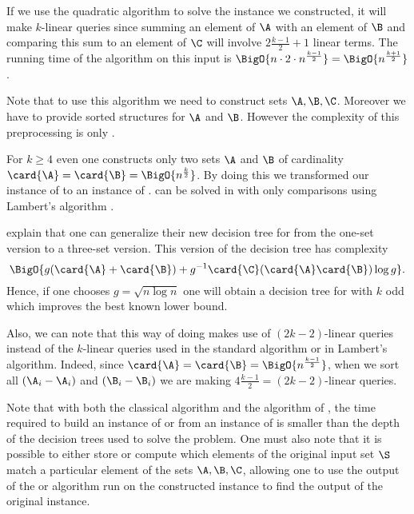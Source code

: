 If we use the quadratic \threeSUM algorithm to solve the instance we
constructed, it will make \(k\)-linear queries since summing an element of
\(\A\) with an element of \(\B\) and comparing this sum to an element of
\(\C\) will involve \(2 \frac{k-1}{2} + 1\) linear terms. The running time of
the \threeSUM algorithm on this input is \(\BigO{n \cdot 2 \cdot n^{\frac{k-1}{2}}} =
\BigO{n^{\frac{k+1}{2}}}\).

Note that to use this algorithm we need to construct sets \(\A,\B,\C\).
Moreover we have to provide sorted structures for \(\A\) and \(\B\). However
the complexity of this preprocessing is only .

For \(k \ge 4\) even one constructs only two sets \(\A\) and \(\B\) of
cardinality \(\card{\A} = \card{\B} = \BigO{n^{\frac{k}{2}}}\). By doing this
we transformed our instance of \kLDT to an instance of \twoSUM. \twoSUM can be
solved in  with only 
comparisons using Lambert's algorithm \cite{lambert:1990}.

\citet*{gronlund:2014} explain that one can generalize their new decision tree
for \threeSUM from the one-set version to a three-set version. This version of
the decision tree has complexity
\begin{displaymath}
\BigO{g(\card{\A}+\card{\B}) + g^{-1}\card{\C}(\card{\A}\card{\B})\log g}.
\end{displaymath}
Hence, if one chooses \(g = \sqrt{n \log n}\) one will obtain a
 decision tree for \kLDT with $k$ odd
which improves the best known lower bound.

Also, we can note that this way of doing makes use of \((2k-2)\)-linear queries
instead of the \(k\)-linear queries used in the standard \threeSUM
algorithm or in Lambert's algorithm. Indeed, since \(\card{\A} = \card{\B} =
\BigO{n^{\frac{k-1}{2}}}\), when we sort all \((\A_i - \A_i)\) and \((\B_i -
\B_i)\) we are making \(4 \frac{k-1}{2} = (2k-2)\)-linear queries.

Note that with both the classical algorithm and the algorithm of
\citet*{gronlund:2014}, the time required to build an instance of \twoSUM or
\threeSUM from an instance of \kLDT is smaller than the depth of the decision
trees used to solve the problem. One must also note that it is possible to
either store or compute which elements of the original input set \(\S\) match a
particular element of the sets \(\A,\B,\C\), allowing one to use the output of
the \twoSUM or \threeSUM algorithm run on the constructed instance to find the
output of the original \kLDT instance.

